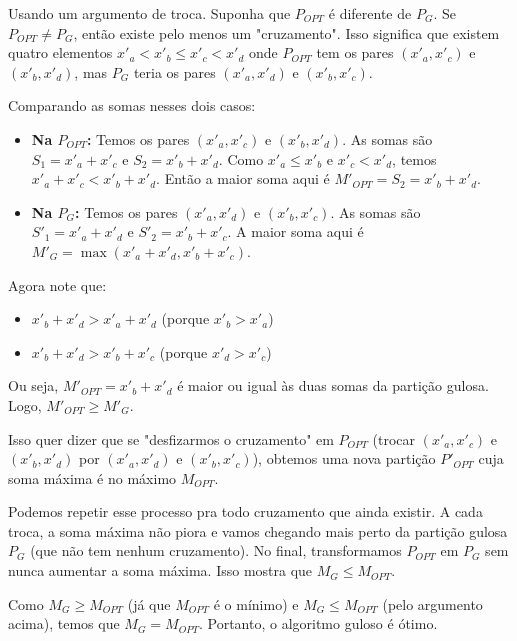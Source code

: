 \documentclass[a4paper,12pt]{article}
\begin{document}
Usando um argumento de troca. Suponha que $P_{OPT}$ é diferente de $P_G$.
Se $P_{OPT} \ne P_G$, então existe pelo menos um "cruzamento". Isso significa que existem quatro elementos $x'_a < x'_b \le x'_c < x'_d$ onde $P_{OPT}$ tem os pares $(x'_a, x'_c)$ e $(x'_b, x'_d)$, mas $P_G$ teria os pares $(x'_a, x'_d)$ e $(x'_b, x'_c)$.

Comparando as somas nesses dois casos:
\begin{itemize}
    \item \textbf{Na $P_{OPT}$:} Temos os pares $(x'_a, x'_c)$ e $(x'_b, x'_d)$.
    As somas são $S_1 = x'_a + x'_c$ e $S_2 = x'_b + x'_d$.
    Como $x'_a \le x'_b$ e $x'_c < x'_d$, temos $x'_a + x'_c < x'_b + x'_d$.
    Então a maior soma aqui é $M'_{OPT} = S_2 = x'_b + x'_d$.
    
    \item \textbf{Na $P_G$:} Temos os pares $(x'_a, x'_d)$ e $(x'_b, x'_c)$.
    As somas são $S'_1 = x'_a + x'_d$ e $S'_2 = x'_b + x'_c$.
    A maior soma aqui é $M'_G = \max(x'_a + x'_d, x'_b + x'_c)$.
\end{itemize}

Agora note que:
\begin{itemize}
    \item $x'_b + x'_d > x'_a + x'_d$ (porque $x'_b > x'_a$)
    \item $x'_b + x'_d > x'_b + x'_c$ (porque $x'_d > x'_c$)
\end{itemize}
Ou seja, $M'_{OPT} = x'_b + x'_d$ é maior ou igual às duas somas da partição gulosa.
Logo, $M'_{OPT} \ge M'_G$.

Isso quer dizer que se "desfizarmos o cruzamento" em $P_{OPT}$ (trocar $(x'_a, x'_c)$ e $(x'_b, x'_d)$ por $(x'_a, x'_d)$ e $(x'_b, x'_c)$), obtemos uma nova partição $P'_{OPT}$ cuja soma máxima é no máximo $M_{OPT}$. 

Podemos repetir esse processo pra todo cruzamento que ainda existir. A cada troca, a soma máxima não piora e vamos chegando mais perto da partição gulosa $P_G$ (que não tem nenhum cruzamento).
No final, transformamos $P_{OPT}$ em $P_G$ sem nunca aumentar a soma máxima.
Isso mostra que $M_G \le M_{OPT}$.

Como $M_G \ge M_{OPT}$ (já que $M_{OPT}$ é o mínimo) e $M_G \le M_{OPT}$ (pelo argumento acima), temos que $M_G = M_{OPT}$.
Portanto, o algoritmo guloso é ótimo.
\end{document}
